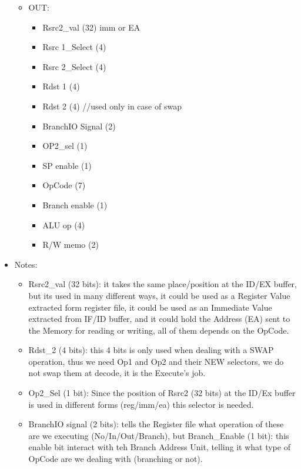 \documentclass[12pt]{report}
\begin{document}
\begin{itemize}
\begin{itemize}
        \item OUT:
        \begin{itemize}
            \item Rsrc2_val (32) imm or EA
            \item Rsrc 1_Select (4)
            \item Rsrc 2_Select (4)
            \item Rdst 1 (4)
            \item Rdst 2 (4) //used only in case of swap
            \item BranchIO Signal (2)
            \item OP2_sel (1)
            \item SP enable (1)
            \item OpCode (7)
            \item Branch enable (1)
            \item ALU op (4)
            \item R/W memo (2)
        \end{itemize}
    \end{itemize}
    \item Notes:
    \begin{itemize}
        \item Rsrc2_val (32 bits): it takes the same place/position at the ID/EX buffer, but its used in many different ways, it could be used as a Register Value extracted form register file, it could be used as an Immediate Value extracted from IF/ID buffer, and it could hold the Address (EA) sent to the Memory for reading or writing, all of them depends on the OpCode.
        \item Rdst_2 (4 bits): this 4 bits is only used when dealing with a SWAP operation, thus we need Op1 and Op2 and their NEW selectors, we do not swap them at decode, it is the Execute's job.
        \item Op2_Sel (1 bit): Since the position of Rsrc2 (32 bits) at the ID/Ex buffer is used in different forms (reg/imm/ea) this selector is needed.
        \item BranchIO signal (2 bits): tells the Register file what operation of these are we executing (No/In/Out/Branch), but Branch_Enable (1 bit): this enable bit interact with teh Branch Address Unit, telling it what type of OpCode are we dealing with (branching or not).
    \end{itemize}
    
\end{itemize}
\end{document}
